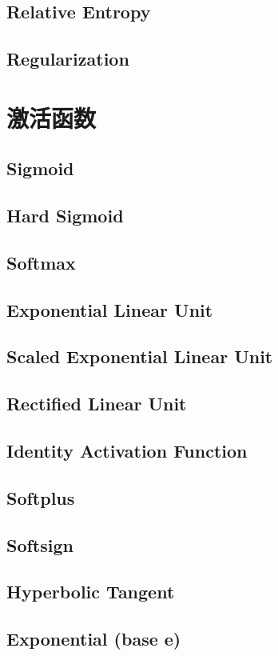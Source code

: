 \documentclass[oneside]{book}
\begin{document}
		\section{Relative Entropy}
		\section{Regularization}

	\chapter{激活函数}
		\section{Sigmoid}
		\section{Hard Sigmoid}
		\section{Softmax}
		\section{Exponential Linear Unit}
		\section{Scaled Exponential Linear Unit}
		\section{Rectified Linear Unit}
		\section{Identity Activation Function}
		\section{Softplus}
		\section{Softsign}
		\section{Hyperbolic Tangent}
		\section{Exponential (base e)}
\end{document}
